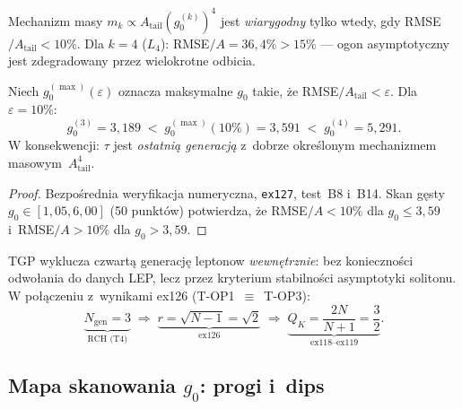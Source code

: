 \begin{hypothesis}\label{hyp:T4-rch}
Mechanizm masy $m_k \propto A_{\mathrm{tail}}(g_0^{(k)})^4$ jest
\emph{wiarygodny} tylko wtedy, gdy RMSE$/A_{\mathrm{tail}} < 10\%$.
Dla $k = 4$ ($L_4$): RMSE$/A = 36{,}4\% > 15\%$ --- ogon
asymptotyczny jest zdegradowany przez wielokrotne odbicia.
\end{hypothesis}

\begin{theorem}%
\label{thm:T4-rch}
Niech $g_0^{(\max)}(\varepsilon)$ oznacza maksymalne $g_0$ takie, \.ze
RMSE$/A_{\mathrm{tail}} < \varepsilon$.  Dla $\varepsilon = 10\%$:
\[
  g_0^{(3)} = 3{,}189
  \;<\; g_0^{(\max)}(10\%) = 3{,}591
  \;<\; g_0^{(4)} = 5{,}291.
\]
W konsekwencji: $\tau$ jest \emph{ostatni\k{a} genera\-cj\k{a}} z~dobrze
okre\'slonym mechanizmem masowym~$A_{\mathrm{tail}}^4$.
\end{theorem}

\begin{proof}
Bezpo\'srednia weryfikacja numeryczna, \texttt{ex127}, test~B8 i~B14.
Skan g\k{e}sty $g_0 \in [1{,}05, 6{,}00]$ (50 punkt\'ow) potwierdza, \.ze
RMSE$/A < 10\%$ dla $g_0 \leq 3{,}59$ i~RMSE$/A > 10\%$ dla
$g_0 > 3{,}59$.
\end{proof}

\begin{corollary}\label{cor:T4-top3}
TGP wyklucza czwart\k{a} genera\-cj\k{e} leptonow \emph{wewn\k{e}trznie}:
bez konieczno\'sci odwo\l{}ania do danych LEP, lecz przez kryterium
stabilno\'sci asymptotyki solitonu.  W po\l{}\k{a}czeniu z~wynikami
ex126 (T-OP1~$\equiv$~T-OP3):
\begin{equation}\label{eq:T4-chain}
  \underbrace{N_{\mathrm{gen}} = 3}_{\text{RCH (T4)}}
  \;\Longrightarrow\;
  \underbrace{r = \sqrt{N-1} = \sqrt{2}}_{\text{ex126}}
  \;\Longrightarrow\;
  \underbrace{Q_K = \frac{2N}{N+1} = \frac{3}{2}}_{\text{ex118--ex119}}.
\end{equation}
\end{corollary}

\subsection{Mapa skanowania $g_0$: progi i~dips}
\label{app:T4-scan}

